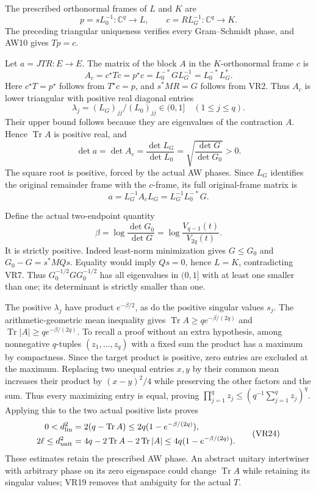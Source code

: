 The prescribed orthonormal frames of \(L\) and \(K\) are
\[
 p=sL_0^{-1}:\mathbb C^q\longrightarrow L,\qquad
 c=RL_G^{-1}:\mathbb C^q\longrightarrow K. \tag{VR18}
\]
The preceding triangular uniqueness verifies every Gram--Schmidt phase, and AW10 gives \(Tp=c\).

Let \(a=JTR:E\to E\). The matrix of the block \(A\) in the \(K\)-orthonormal frame \(c\) is
\[
 A_c=c^\star Tc=p^\star c
 =L_0^{-*}G L_G^{-1}
 =L_0^{-*}L_G^*. \tag{VR19}
\]
Here \(c^\star T=p^\star\) follows from \(T^\star c=p\), and \(s^*MR=G\) follows from VR2. Thus \(A_c\) is lower triangular with positive real diagonal entries
\[
 \lambda_j=(L_G)_{jj}/(L_0)_{jj}\in(0,1]\quad(1\le j\le q).
 \tag{VR20}
\]
Their upper bound follows because they are eigenvalues of the contraction \(A\). Hence \(\operatorname{Tr}A\) is positive real, and
\[
 \det a=\det A_c
 =\frac{\det L_G}{\det L_0}
 =\sqrt{\frac{\det G}{\det G_0}}>0. \tag{VR21}
\]
The square root is positive, forced by the actual AW phases. Since \(L_G\) identifies the original remainder frame with the \(c\)-frame, its full original-frame matrix is
\[
 a=L_G^{-1}A_cL_G=L_G^{-1}L_0^{-*}G. \tag{VR22}
\]

Define the actual two-endpoint quantity
\[
 \beta=\log\frac{\det G_0}{\det G}
       =\log\frac{V_{q-1}(t)}{V_{2q}(t)}. \tag{VR23}
\]
It is strictly positive. Indeed least-norm minimization gives \(G\le G_0\) and
\(G_0-G=s^*MQs\). Equality would imply \(Qs=0\), hence \(L=K\), contradicting VR7. Thus \(G_0^{-1/2}GG_0^{-1/2}\) has all eigenvalues in \((0,1]\) with at least one smaller than one; its determinant is strictly smaller than one.

The positive \(\lambda_j\) have product \(e^{-\beta/2}\), as do the positive singular values \(s_j\). The arithmetic-geometric mean inequality gives
\(\operatorname{Tr}A\ge q e^{-\beta/(2q)}\) and
\(\operatorname{Tr}|A|\ge q e^{-\beta/(2q)}\).
To recall a proof without an extra hypothesis, among nonnegative \(q\)-tuples \((z_1,\ldots,z_q)\) with a fixed sum the product has a maximum by compactness. Since the target product is positive, zero entries are excluded at the maximum. Replacing two unequal entries \(x,y\) by their common mean increases their product by \((x-y)^2/4\) while preserving the other factors and the sum. Thus every maximizing entry is equal, proving \(\prod_{j=1}^q z_j\le(q^{-1}\sum_{j=1}^q z_j)^q\). Applying this to the two actual positive lists proves
\[
 \begin{aligned}
 0<d_{\rm lin}^2
 &=2(q-\operatorname{Tr}A)
 \le2q(1-e^{-\beta/(2q)}),\\
 2\ell\le d_{\rm unit}^2
 &=4q-2\operatorname{Tr}A-2\operatorname{Tr}|A|
 \le4q(1-e^{-\beta/(2q)}).
 \end{aligned} \tag{VR24}
\]
These estimates retain the prescribed AW phase. An abstract unitary intertwiner with arbitrary phase on its zero eigenspace could change \(\operatorname{Tr}A\) while retaining its singular values; VR19 removes that ambiguity for the actual \(T\).

